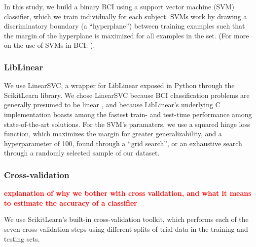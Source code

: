 In this study, we build a binary BCI using a support vector machine (SVM) classifier, which we train individually for each subject. SVMs work by drawing a discriminatory boundary (a ``hyperplane'') between training examples such that the margin of the hyperplane is maximized for all examples in the set. (For more on the use of SVMs in BCI: \cite{garrett_comparison_2003,grierson_better_2011}). 

\subsubsection{LibLinear}
We use LinearSVC, \cite{fan_liblinear:_2008} a wrapper for LibLinear exposed in Python through the ScikitLearn library. \cite{pedregosa_scikit-learn:_2011} We chose LinearSVC because BCI classification problems are generally presumed to be linear  \cite{garrett_comparison_2003,lotte_review_2007}, and because LibLinear's underlying C implementation boasts among the fastest train- and test-time performance among state-of-the-art solutions. \cite{fan_liblinear:_2008} For the SVM's paramaters, we use a squared hinge loss function, which maximizes the margin for greater generalizability, and a hyperparameter of 100, found through a ``grid search'', or an exhaustive search through a randomly selected sample of our dataset. 

\subsubsection{Cross-validation}

\textcolor{red}{\bf explanation of why we bother with cross validation, and what it means to estimate the accuracy of a classifier }

We use ScikitLearn's built-in cross-validation toolkit, which performs each of the seven cross-validation steps using different splits of trial data in the training and testing sets. 
